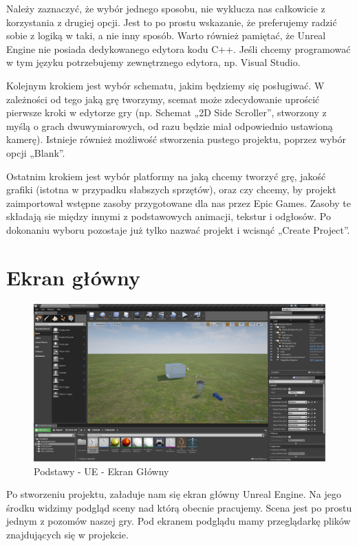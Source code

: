 \documentclass[12pt]{xmgr}
\begin{document}
Należy zaznaczyć, że wybór jednego sposobu, nie wyklucza nas całkowicie z korzystania z drugiej opcji. Jest to po prostu wskazanie, że preferujemy radzić sobie z logiką w taki, a nie inny sposób.
Warto również pamiętać, że Unreal Engine nie posiada dedykowanego edytora kodu C++. Jeśli chcemy programować w tym języku potrzebujemy zewnętrznego edytora, np. Visual Studio.

Kolejnym krokiem jest wybór schematu, jakim będziemy się posługiwać. W zależności od tego jaką grę tworzymy, scemat może zdecydowanie uprościć pierwsze kroki w edytorze gry (np. Schemat „2D Side Scroller”, stworzony z myślą o grach dwuwymiarowych, od razu będzie miał odpowiednio ustawioną kamerę). Istnieje również możliwość stworzenia pustego projektu, poprzez wybór opcji „Blank”.

Ostatnim krokiem jest wybór platformy na jaką chcemy tworzyć grę, jakość grafiki (istotna w przypadku słabszych sprzętów), oraz czy chcemy, by projekt zaimportował wstępne zasoby przygotowane dla nas przez Epic Games. Zasoby te składają sie między innymi z podstawowych animacji, tekstur i odgłosów.
Po dokonaniu wyboru pozostaje już tylko nazwać projekt i wcisnąć „Create Project”.

\newpage
\section{Ekran główny}

\begin{figure}[!htb]
    \begin{center}
    \includegraphics[scale=0.25]{Screeny/Main}
    \end{center}
    \caption{Podstawy - UE - Ekran Główny}
\end{figure}

Po stworzeniu projektu, załaduje nam się ekran główny Unreal Engine. Na jego środku widzimy podgląd sceny nad którą obecnie pracujemy. Scena jest po prostu jednym z pozomów naszej gry.
Pod ekranem podglądu mamy przeglądarkę plików znajdujących się w projekcie.
\end{document}
